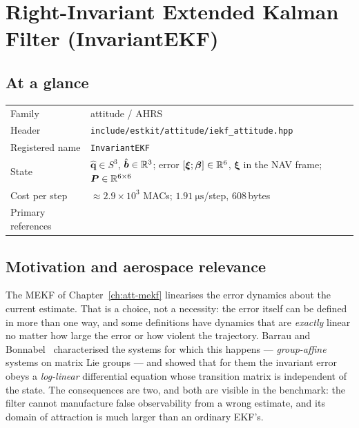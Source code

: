 \chapter{Right-Invariant Extended Kalman Filter (InvariantEKF)}
\label{ch:att-iekf}

\section*{At a glance}
\begin{tabular}{@{}l>{\raggedright\arraybackslash}p{}@{}}
Family & attitude / AHRS \\
Header & \texttt{include/estkit/attitude/iekf\_attitude.hpp} \\
Registered name & \texttt{InvariantEKF} \\
State & $\hat{\bm{q}}\in S^3$, $\hat{\bm{b}}\in\mathbb{R}^3$; error
 $[\bm{\xi};\bm{\beta}]\in\mathbb{R}^6$, $\bm{\xi}$ in the NAV frame; $\bm{P}\in\mathbb{R}^{6\times6}$ \\
Cost per step & $\approx2.9\times10^3$ MACs; $\SI{1.91}{\micro\second}$/step, 608\,bytes \\
Primary references & \cite{barrau2017iekf,barrau2018review,bonnabel2007,bonnabel2009} \\
\end{tabular}

\section{Motivation and aerospace relevance}
The MEKF of Chapter~\ref{ch:att-mekf} linearises the error dynamics about the current estimate. That
is a choice, not a necessity: the error itself can be defined in more than one way, and some
definitions have dynamics that are \emph{exactly} linear no matter how large the error or how
violent the trajectory. Barrau and Bonnabel~\cite{barrau2017iekf} characterised the systems for
which this happens --- \emph{group-affine} systems on matrix Lie groups --- and showed that for them
the invariant error obeys a \emph{log-linear} differential equation whose transition matrix is
independent of the state. The consequences are two, and both are visible in the benchmark: the
filter cannot manufacture false observability from a wrong estimate, and its domain of attraction is
much larger than an ordinary EKF's.

